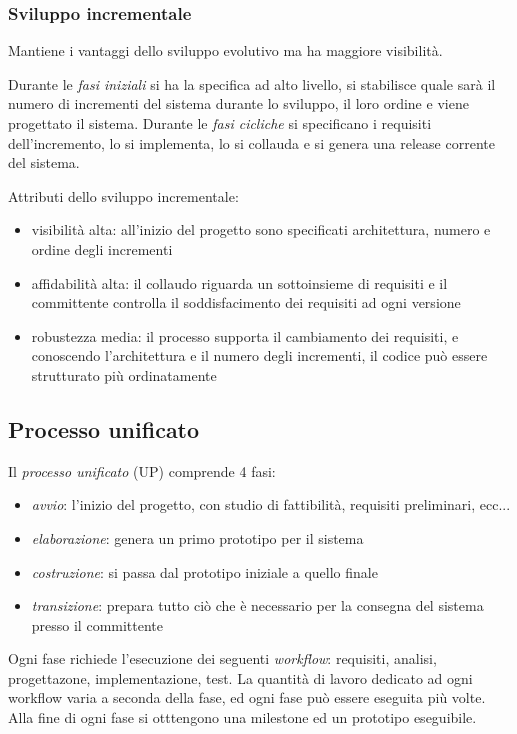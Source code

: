 \documentclass[11pt]{article}
\begin{document}
\subsubsection*{Sviluppo incrementale}
Mantiene i vantaggi dello sviluppo evolutivo ma ha maggiore visibilità.

Durante le \textit{fasi iniziali} si ha la specifica ad alto livello, si stabilisce quale sarà il numero di incrementi del 
sistema durante lo sviluppo, il loro ordine e viene progettato il sistema.
Durante le \textit{fasi cicliche} si specificano i requisiti dell'incremento, lo si implementa, lo si collauda e si genera 
una release corrente del sistema.

Attributi dello sviluppo incrementale:
\begin{itemize}
    \item visibilità alta: all'inizio del progetto sono specificati architettura, numero e ordine degli incrementi
    \item affidabilità alta: il collaudo riguarda un sottoinsieme di requisiti e il committente controlla il soddisfacimento 
    dei requisiti ad ogni versione 
    \item robustezza media: il processo supporta il cambiamento dei requisiti, e conoscendo l'architettura e il numero 
    degli incrementi, il codice può essere strutturato più ordinatamente
\end{itemize}
\subsection{Processo unificato}
Il \textit{processo unificato} (UP) comprende 4 fasi:
\begin{itemize}
    \item \textit{avvio}: l'inizio del progetto, con studio di fattibilità, requisiti preliminari, ecc... 
    \item \textit{elaborazione}: genera un primo prototipo per il sistema 
    \item \textit{costruzione}: si passa dal prototipo iniziale a quello finale 
    \item \textit{transizione}: prepara tutto ciò che è necessario per la consegna del sistema presso il committente 
\end{itemize}
Ogni fase richiede l'esecuzione dei seguenti \textit{workflow}: requisiti, analisi, progettazone, implementazione, test.
La quantità di lavoro dedicato ad ogni workflow varia a seconda della fase, ed ogni fase può essere eseguita più volte.
Alla fine di ogni fase si otttengono una milestone ed un prototipo eseguibile.
\end{document}
